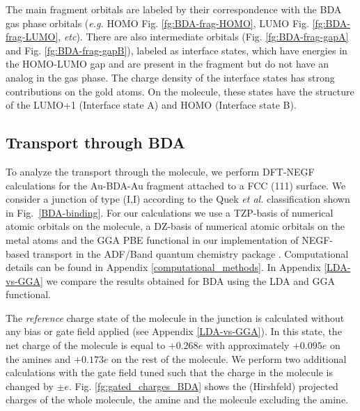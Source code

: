 \documentclass[aip,jcp,a4paper,reprint,floatfix,superscriptaddress]{revtex4-1}
\newcommand{\etal}{\emph{et al.}\xspace}
\newcommand{\eg}{\emph{e.g.}\xspace}
\begin{document}
The main fragment orbitals are labeled by their correspondence with the BDA gas phase orbitals (\eg HOMO Fig. \ref{fg:BDA-frag-HOMO}, LUMO Fig. \ref{fg:BDA-frag-LUMO}, \textit{etc}). There are also intermediate orbitals (Fig. \ref{fg:BDA-frag-gapA} and Fig. \ref{fg:BDA-frag-gapB}), labeled as interface states, which have energies in the HOMO-LUMO gap and are present in the fragment but do not have an analog in the gas phase. The charge density of the interface states has strong contributions on the gold atoms. On the molecule, these states have the structure of the LUMO+1 (Interface state A) and HOMO (Interface state B).


\subsection{Transport through BDA} \label{Sec:TransportBDA}

To analyze the transport through the molecule, we perform DFT-NEGF calculations for the Au-BDA-Au fragment attached to a FCC (111) surface. We consider a junction of type (I,I) according to the Quek \etal classification \cite{Quek2007} shown in Fig.~\ref{BDA-binding}. For our calculations we use a TZP-basis of numerical atomic orbitals on the molecule, a DZ-basis of numerical atomic orbitals on the metal atoms and the GGA PBE functional in our implementation of NEGF-based transport in the ADF/Band quantum chemistry package \cite{Velde1991,Wiesenekker1991,Verzijl2012}. Computational details can be found in Appendix \ref{computational_methods}. In Appendix \ref{LDA-vs-GGA} we compare the results obtained for BDA using the LDA and GGA functional.

The \textit{reference} charge state of the molecule in the junction is calculated without any bias or gate field applied (see Appendix \ref{LDA-vs-GGA}). In this state, the net charge of the molecule is equal to $+0.268e$ with approximately $+0.095e$ on the amines and $+0.173e$ on the rest of the molecule. We perform two additional calculations with the gate field tuned such that the charge in the molecule is changed by $\pm e$. Fig. \ref{fg:gated_charges_BDA} shows the (Hirshfeld) projected charges of the whole molecule, the amine and the molecule excluding the amine.
\end{document}
